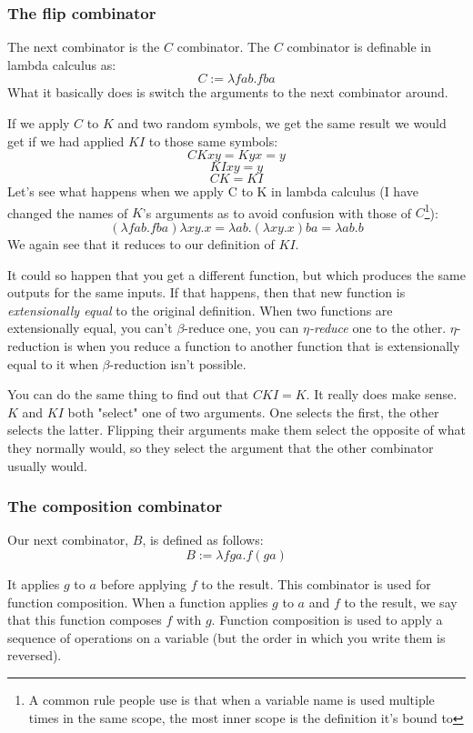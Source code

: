 \documentclass[11pt]{article}
\begin{document}
\subsubsection{The flip combinator}\label{flipcombinator}

The next combinator is the \(C\) combinator. The \(C\) combinator is definable
in lambda calculus as:
\[C:=\lambda fab.fba\]
What it basically does is switch the arguments to the next combinator around.

If we apply \(C\) to \(K\) and two random symbols, we get the same result we
would get if we had applied \(KI\) to those same symbols:
\[CKxy=Kyx=y\]
\[KIxy=y\]
\[CK=KI\]
Let's see what happens when we apply C to K in lambda calculus (I have changed
the names of \(K\)'s arguments as to avoid confusion with those of
\(C\)\footnote{A common rule people use is that when a variable name is used
multiple times in the same scope, the most inner scope is the definition it's
bound to}):
\[(\lambda fab.fba)\lambda xy.x=\lambda ab.(\lambda xy.x)ba=\lambda ab.b\]
We again see that it reduces to our definition of \(KI\).

It could so happen that you get a different function, but which produces the
same outputs for the same inputs. If that happens, then that new function is
\emph{extensionally equal} to the original definition. When two functions are
extensionally equal, you can't \(\beta\)-reduce one, you can
\emph{\(\eta\)-reduce} one to the other. \(\eta\)-reduction is when you reduce
a function to another function that is extensionally equal to it when
\(\beta\)-reduction isn't possible.

You can do the same thing to find out that \(CKI=K\). It really does make
sense. \(K\) and \(KI\) both "select" one of two arguments. One selects the
first, the other selects the latter. Flipping their arguments make them select
the opposite of what they normally would, so they select the argument that the
other combinator usually would.

\subsubsection{The composition combinator}\label{composition}

Our next combinator, \(B\), is defined as follows:
\[B:=\lambda fga.f(ga)\]

It applies \(g\) to \(a\) before applying \(f\) to the result. This combinator
is used for function composition. When a function applies \(g\) to \(a\) and
\(f\) to the result, we say that this function composes \(f\) with \(g\).
Function composition is used to apply a sequence of operations on a variable
(but the order in which you write them is reversed).
\end{document}
